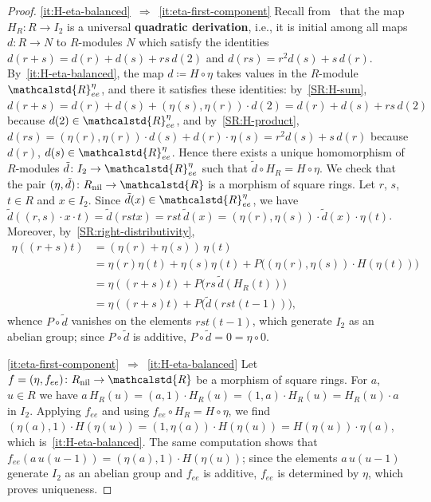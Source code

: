 \documentclass[reqno,a4paper]{amsart}
\theoremstyle{plain}
\theoremstyle{definition}
\newcommand{\defn}{\textbf}
\newcommand{\DefEq}{\coloneq}
\newcommand{\R}{\ensuremath{\mathcalstd{R}}}
\DeclareMathOperator{\nil}{nil}
\newcommand{\Ree}{\ensuremath{\R_{ee}}}
\begin{document}
\begin{proof}
  \ref{it:H-eta-balanced}~\(\Rightarrow\)~\ref{it:eta-first-component} Recall from~\cite[Theorem~3.6]{P2RM} that the map \(H_{R}\colon R\to I_{2}\) is a universal \defn{quadratic derivation}, i.e., it is initial among all maps \(d\colon R\to N\) to \(R\)-modules \(N\) which satisfy the identities \(d(r+s)=d(r)+d(s)+rs\,d(2)\) and \(d(rs)=r^{2}d(s)+s\,d(r)\). By~\ref{it:H-eta-balanced}, the map \(d\DefEq H\circ\eta\) takes values in the \(R\)-module \(\Ree^{\eta}\), and there it satisfies these identities: by~\ref{SR:H-sum}, \(d(r+s)=d(r)+d(s)+(\eta(s),\eta(r))\cdot d(2)=d(r)+d(s)+rs\,d(2)\) because \(d(2)\in\Ree^{\eta}\), and by~\ref{SR:H-product}, \(d(rs)=(\eta(r),\eta(r))\cdot d(s)+d(r)\cdot\eta(s)=r^{2}d(s)+s\,d(r)\) because \(d(r)\), \(d(s)\in\Ree^{\eta}\). Hence there exists a unique homomorphism of \(R\)-modules \(\tilde{d}\colon I_{2}\to\Ree^{\eta}\) such that \(\tilde{d}\circ H_{R}=H\circ\eta\). We check that the pair \((\eta,\tilde{d})\colon R_{\nil}\to\R\) is a morphism of square rings. Let \(r\), \(s\), \(t\in R\) and \(x\in I_{2}\). Since \(\tilde{d}(x)\in\Ree^{\eta}\), we have \(\tilde{d}((r,s)\cdot x\cdot t)=\tilde{d}(rstx)=rst\,\tilde{d}(x)=(\eta(r),\eta(s))\cdot\tilde{d}(x)\cdot\eta(t)\). Moreover, by~\ref{SR:right-distributivity},
  \begin{align*}
    \eta((r+s)t) & =(\eta(r)+\eta(s))\,\eta(t)                                                   \\
                 & =\eta(r)\eta(t)+\eta(s)\eta(t)+P\bigl((\eta(r),\eta(s))\cdot H(\eta(t))\bigr) \\
                 & =\eta((r+s)t)+P\bigl(rs\,\tilde{d}(H_{R}(t))\bigr)                            \\
                 & =\eta((r+s)t)+P\bigl(\tilde{d}(rst(t-1))\bigr)\text{,}
  \end{align*}
  whence \(P\circ\tilde{d}\) vanishes on the elements \(rst(t-1)\), which generate \(I_{2}\) as an abelian group; since \(P\circ\tilde{d}\) is additive, \(P\circ\tilde{d}=0=\eta\circ 0\).

  \ref{it:eta-first-component}~\(\Rightarrow\)~\ref{it:H-eta-balanced} Let \(f=(\eta,f_{ee})\colon R_{\nil}\to\R\) be a morphism of square rings. For \(a\), \(u\in R\) we have \(a\,H_{R}(u)=(a,1)\cdot H_{R}(u)=(1,a)\cdot H_{R}(u)=H_{R}(u)\cdot a\) in \(I_{2}\). Applying \(f_{ee}\) and using \(f_{ee}\circ H_{R}=H\circ\eta\), we find \((\eta(a),1)\cdot H(\eta(u))=(1,\eta(a))\cdot H(\eta(u))=H(\eta(u))\cdot\eta(a)\), which is~\ref{it:H-eta-balanced}. The same computation shows that \(f_{ee}(a\,u(u-1))=(\eta(a),1)\cdot H(\eta(u))\); since the elements \(a\,u(u-1)\) generate \(I_{2}\) as an abelian group and \(f_{ee}\) is additive, \(f_{ee}\) is determined by \(\eta\), which proves uniqueness.
\end{proof}
\end{document}
